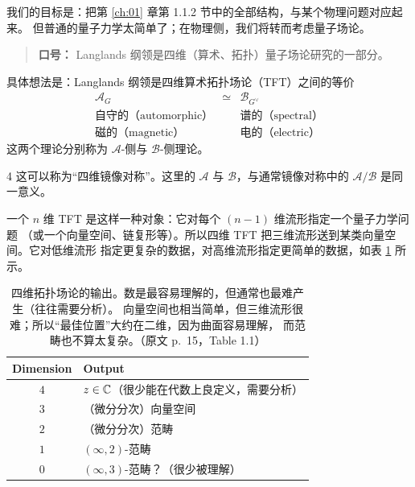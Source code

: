我们的目标是：把第 \ref{ch:01} 章第 1.1.2 节中的全部结构，与某个物理问题对应起来。
但普通的量子力学太简单了；在物理侧，我们将转而考虑量子场论。

\begin{quote}
\textbf{口号：} Langlands 纲领是四维（算术、拓扑）量子场论研究的一部分。
\end{quote}

具体想法是：Langlands 纲领是四维算术拓扑场论（TFT）之间的等价
\begin{equation}\tag{1.22}\label{eq:1.22}
\begin{array}{ccc}
\mathcal{A}_G & \simeq & \mathcal{B}_{G^{\vee}}\\[2pt]
\text{自守的（automorphic）} & & \text{谱的（spectral）}\\
\text{磁的（magnetic）} & & \text{电的（electric）}
\end{array}
\end{equation}
这两个理论分别称为 $\mathcal{A}$-侧与 $\mathcal{B}$-侧理论。

\begin{srcrem}{4}
这可以称为“四维镜像对称”。这里的 $\mathcal{A}$ 与 $\mathcal{B}$，与通常镜像对称中的
$\mathcal{A}/\mathcal{B}$ 是同一意义。
\end{srcrem}


一个 $n$ 维 TFT 是这样一种对象：它对每个 $(n-1)$ 维流形指定一个量子力学问题
（或一个向量空间、链复形等）。所以四维 TFT 把三维流形送到某类向量空间。它对低维流形
指定更复杂的数据，对高维流形指定更简单的数据，如表 \ref{tab:1-1} 所示。

\begin{table}[htbp]
  \centering
  \caption{四维拓扑场论的输出。数是最容易理解的，但通常也最难产生（往往需要分析）。
    向量空间也相当简单，但三维流形很难；所以“最佳位置”大约在二维，因为曲面容易理解，
    而范畴也不算太复杂。（原文 p.~15，Table 1.1）}
  \label{tab:1-1}
  \begin{tabular}{c|l}
    \toprule
    Dimension & Output\\
    \midrule
    $4$ & $z\in\mathbb{C}$（很少能在代数上良定义，需要分析）\\
    $3$ & （微分分次）向量空间\\
    $2$ & （微分分次）范畴\\
    $1$ & $(\infty,2)$-范畴\\
    $0$ & $(\infty,3)$-范畴？（很少被理解）\\
    \bottomrule
  \end{tabular}
\end{table}

